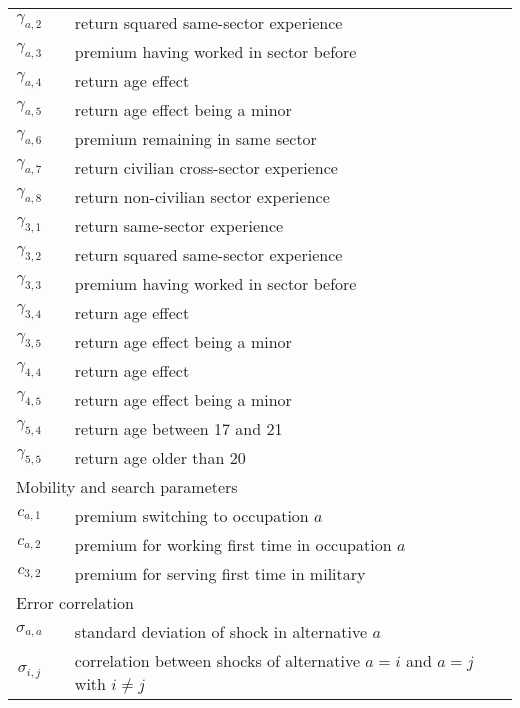 \begin{ThreePartTable}
\begin{longtable}{@{}cll@{}}
		$\gamma_{a,2}$       &  & return squared same-sector experience         								\\
		$\gamma_{a,3}$       &  & premium having worked in sector before        							   \\
		$\gamma_{a,4}$       &  & return age effect                             											     \\
		$\gamma_{a,5}$       &  & return age effect being a minor               										\\
		$\gamma_{a,6}$       &  & premium remaining in same sector              								   \\
		$\gamma_{a,7}$       &  & return civilian cross-sector experience       								    \\
		$\gamma_{a,8}$       &  & return non-civilian sector experience       										 \\
		$\gamma_{3,1}$       &  & return same-sector experience                 									  \\
		$\gamma_{3,2}$       &  & return squared same-sector experience    										 \\
		$\gamma_{3,3}$       &  & premium having worked in sector before   										\\
		$\gamma_{3,4}$       &  & return age effect                             												 \\
		$\gamma_{3,5}$       &  & return age effect being a minor              	   										\\
		$\gamma_{4,4}$       &  & return age effect                             												 \\
		$\gamma_{4,5}$       &  & return age effect being a minor                  										\\
		$\gamma_{5,4}$       &  & return age between 17 and 21                 	  									   \\
		$\gamma_{5,5}$       &  & return age older than 20							   										\\[7.5pt] \midrule
		\multicolumn{3}{l}{Mobility and search parameters}          													  \\ \midrule
		$c_{a,1}$            &  & premium switching to occupation $a$           									   \\
		$c_{a,2}$            &  & premium for working first time in occupation $a$         										  \\
		$c_{3,2}$            &  & premium for serving first time in military    										  \\[7.5pt] \midrule
		\multicolumn{3}{l}{Error correlation}          													  									\\ \midrule
		$\sigma_{a,a}$	&	& standard deviation of shock in alternative $a$									\\
		$\sigma_{i,j}$ &	& correlation between shocks of alternative $a = i$ and $a=j$ with $i \neq j$ \\
		
	\end{longtable}
\end{ThreePartTable}
